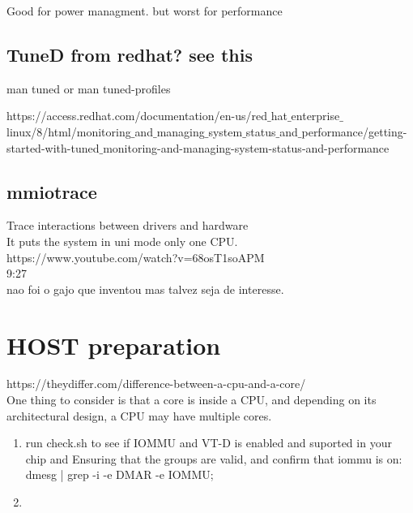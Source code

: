 \documentclass[11pt, a4paper, oneside]{article}
\theoremstyle{definition}
\begin{document}
Good for power managment. but worst for performance\\


\vfill
\pagebreak
\subsection{TuneD from redhat? see this}

man tuned or man tuned-profiles

https://access.redhat.com/documentation/en-us/red$\_$hat$\_$enterprise$\_$linux/8/html/monitoring$\_$and$\_$managing$\_$system$\_$status$\_$and$\_$performance/getting-started-with-tuned$\_$monitoring-and-managing-system-status-and-performance\\


\vfill
\pagebreak
\subsection{mmiotrace}

Trace interactions between drivers and hardware\\
It puts the system in uni mode only one CPU.\\

https://www.youtube.com/watch?v=68osT1soAPM\\
9:27\\
nao foi o gajo que inventou mas talvez seja de interesse.\\

\vfill
\pagebreak


\vfill
\pagebreak
\section{HOST preparation}
https://theydiffer.com/difference-between-a-cpu-and-a-core/\\
One thing to consider is that a core is inside a CPU, and depending on its architectural design, a CPU may have multiple cores.\\

\begin{enumerate}
	\item run check.sh to see if IOMMU and VT-D is enabled and suported in your chip and Ensuring that the groups are valid, and confirm that iommu is on: dmesg | grep -i -e DMAR -e IOMMU;
	\item 
\end{enumerate}
\end{document}
